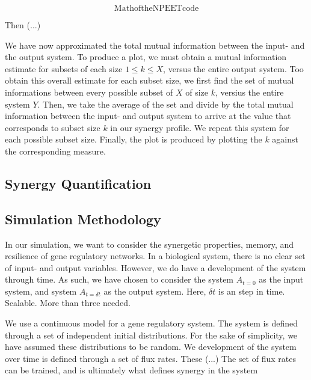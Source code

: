 \documentclass[../main.tex]{subfiles}
\begin{document}
\begin{equation}
\mathrm{Math of the NPEET code}
\end{equation}

Then (...)

We have now approximated the total mutual information between the input- and the output system.
To produce a plot, we must obtain a mutual information estimate for subsets of each size $1 \le k \le X$, versus the entire output system.
Too obtain this overall estimate for each subset size, we first find the set of mutual informations between every possible subset of $X$ of size $k$, versius the entire system $Y$.
Then, we take the average of the set and divide by the total mutual information between the input- and output system to arrive at the value that corresponds to subset size $k$ in our synergy profile.
We repeat this system for each possible subset size.
Finally, the plot is produced by plotting the $k$ against the corresponding measure.

\subsection{Synergy Quantification}



\subsection{Simulation Methodology}

In our simulation, we want to consider the synergetic properties, memory, and resilience of gene regulatory networks.
In a biological system, there is no clear set of input- and output variables.
However, we do have a development of the system through time.
As such, we have chosen to consider the system $A_{t=0}$ as the input system, and system $A_{t=\delta t}$ as the output system.
Here, $\delta t$ is an step in time. %
Scalable. More than three needed.

We use a continuous model for a gene regulatory system.
The system is defined through a set of independent initial distributions.
For the sake of simplicity, we have assumed these distributions to be random.
We development of the system over time is defined through a set of flux rates.
These (...) %
The set of flux rates can be trained, and is ultimately what defines synergy in the system
\end{document}

